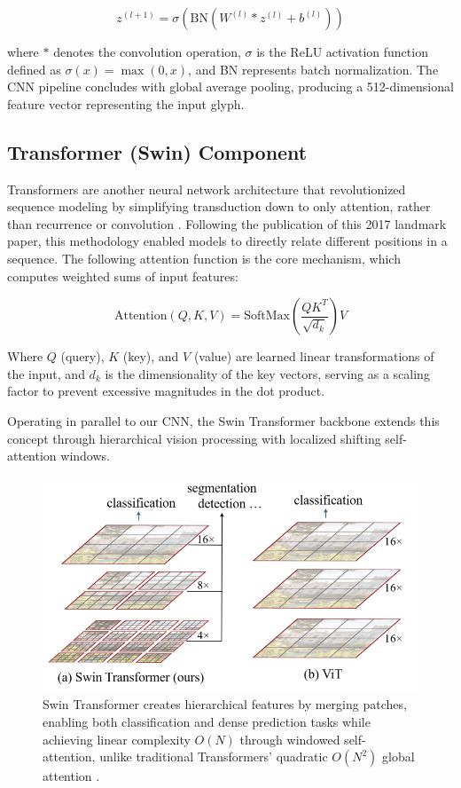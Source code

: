 \documentclass[11pt,a4paper,oneside]{report}
\begin{document}
\begin{equation}
z^{(l+1)} = \sigma\left(\text{BN}\left(W^{(l)} \ast z^{(l)} + b^{(l)}\right)\right)
\end{equation}

where $\ast$ denotes the convolution operation, $\sigma$ is the ReLU activation function defined as $\sigma(x) = \max(0,x)$, and BN represents batch normalization. The CNN pipeline concludes with global average pooling, producing a 512-dimensional feature vector representing the input glyph.

\subsection{Transformer (Swin) Component}
\noindent\hspace{1cm}
Transformers are another neural network architecture that revolutionized sequence modeling by simplifying transduction down to only attention, rather than recurrence or convolution \cite{vaswani_attention_2023}. Following the publication of this 2017 landmark paper, this methodology enabled models to directly relate different positions in a sequence. The following attention function is the core mechanism, which computes weighted sums of input features:

\begin{equation}
\text{Attention}(Q, K, V) = \text{SoftMax}\left(\frac{QK^T}{\sqrt{d_k}}\right)V
\end{equation}

Where $Q$ (query), $K$ (key), and $V$ (value) are learned linear transformations of the input, and $d_k$ is the dimensionality of the key vectors, serving as a scaling factor to prevent excessive magnitudes in the dot product.

Operating in parallel to our CNN, the Swin Transformer backbone \cite{liu_swin_2021} extends this concept through hierarchical vision processing with localized shifting self-attention windows. 

 \begin{figure}[H]
    \centering
    \includegraphics[width=0.8\linewidth]{Images/swin_transformer_architecture (1).png}
    \caption [Swin Transformer vs. Traditional Transformer]{Swin Transformer creates hierarchical features by merging patches, enabling both classification and dense prediction tasks while achieving linear complexity \(O(N)\) through windowed self-attention, unlike traditional Transformers' quadratic \(O(N^2)\) global attention \cite{liu_swin_2021}.}
    \label{fig:swin}
\end{figure}
\end{document}
